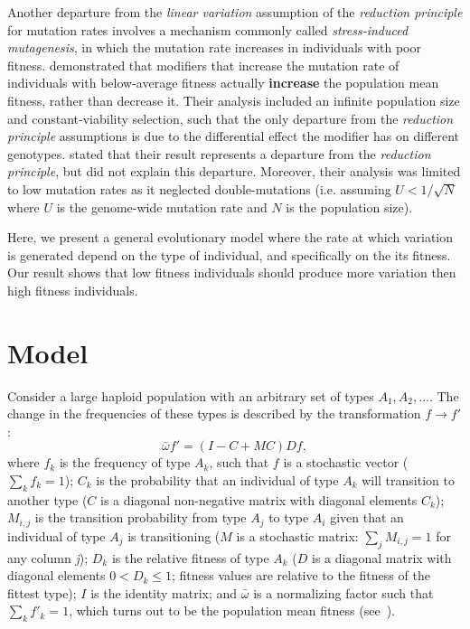 \documentclass[9pt, a4paper, twocolumn]{extarticle}   	%
\begin{document}
Another departure from the \emph{linear variation} assumption of the \emph{reduction principle} for mutation rates involves a mechanism commonly called \emph{stress-induced mutagenesis}, in which the mutation rate increases in individuals with poor fitness.
\citet{Ram2012} demonstrated that modifiers that increase the mutation rate of individuals with below-average fitness actually \textbf{increase} the population mean fitness, rather than decrease it.
Their analysis included an infinite population size and constant-viability selection, such that the only departure from the \emph{reduction principle} assumptions is due to the differential effect the modifier has on different genotypes.
\citet{Ram2012} stated that their result represents a departure from the \emph{reduction principle}, but did not explain this departure.
Moreover, their analysis was limited to low mutation rates as it neglected double-mutations (i.e. assuming $U<1/\sqrt{N}$ where $U$ is the genome-wide mutation rate and $N$ is the population size). 

Here, we present a general evolutionary model where the rate at which variation is generated depend on the type of individual, and specifically on the its fitness.
Our result shows that low fitness individuals should produce more variation then high fitness individuals.

\section*{Model}

Consider a large haploid population with an arbitrary set of types $A_1, A_2, ...$.
The change in the frequencies of these types is described by the transformation $f \to f'$: 
\begin{equation}\label{eq:model}
\bar{\omega} f' = (I-C+MC)D f,
\end{equation}
where $f_k$ is the frequency of type $A_k$, such that $f$ is a stochastic vector ($\sum_k{f_k} = 1$);
$C_k$ is the probability that an individual of type $A_k$ will transition to another type ($C$ is a diagonal non-negative matrix with diagonal elements $C_k$);
$M_{i,j}$ is the transition probability from type $A_j$ to type $A_i$ given that an individual of type $A_j$ is transitioning ($M$ is a stochastic matrix: $\sum_j {M_{i,j}} = 1$ for any column \emph{j}); 
$D_k$ is the relative fitness of type $A_k$ ($D$ is a diagonal matrix with diagonal elements $0 < D_k \le 1$; fitness values are relative to the fitness of the fittest type); 
$I$ is the identity matrix;
and $\bar{\omega}$ is a normalizing factor such that $\sum_k{f'_k}=1$, which turns out to be the population mean fitness (see~).
\end{document}
